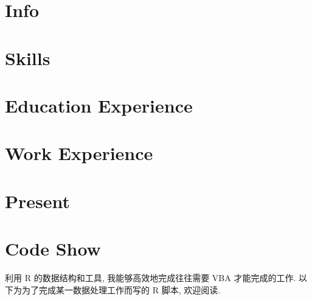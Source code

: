 \documentclass[a4paper]{article}
\begin{document}
	\section*{Info}
		
	\section*{Skills}
		
	\section*{Education Experience}
		
	\section*{Work Experience}
		
	\section*{Present}
		
	\section*{Code Show}
		利用 R 的数据结构和工具, 我能够高效地完成往往需要 VBA 才能完成的工作. 以下为为了完成某一数据处理工作而写的 R 脚本, 欢迎阅读.
			
			
		
			
\end{document}
